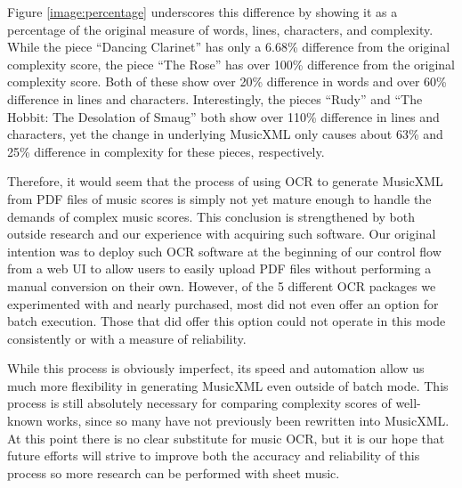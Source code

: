 \documentclass[10pt,preprint]{sigplanconf}
\begin{document}
Figure \ref{image:percentage} underscores this difference by showing it as a percentage of the original measure of words, lines, characters, and complexity. While the piece ``Dancing Clarinet'' has only a 6.68\% difference from the original complexity score, the piece ``The Rose'' has over 100\% difference from the original complexity score. Both of these show over 20\% difference in words and over 60\% difference in lines and characters. Interestingly, the pieces ``Rudy'' and ``The Hobbit: The Desolation of Smaug'' both show over 110\% difference in lines and characters, yet the change in underlying MusicXML only causes about 63\% and 25\% difference in complexity for these pieces, respectively.

Therefore, it would seem that the process of using OCR to generate MusicXML from PDF files of music scores is simply not yet mature enough to handle the demands of complex music scores. This conclusion is strengthened by both outside research \cite{byrd2006prospects} and our experience with acquiring such software. Our original intention was to deploy such OCR software at the beginning of our control flow from a web UI to allow users to easily upload PDF files without performing a manual conversion on their own. However, of the 5 different OCR packages we experimented with and nearly purchased, most did not even offer an option for batch execution. Those that did offer this option could not operate in this mode consistently or with a measure of reliability.

While this process is obviously imperfect, its speed and automation allow us much more flexibility in generating MusicXML even outside of batch mode. This process is still absolutely necessary for comparing complexity scores of well-known works, since so many have not previously been rewritten into MusicXML. At this point there is no clear substitute for music OCR, but it is our hope that future efforts will strive to improve both the accuracy and reliability of this process so more research can be performed with sheet music.
\end{document}

